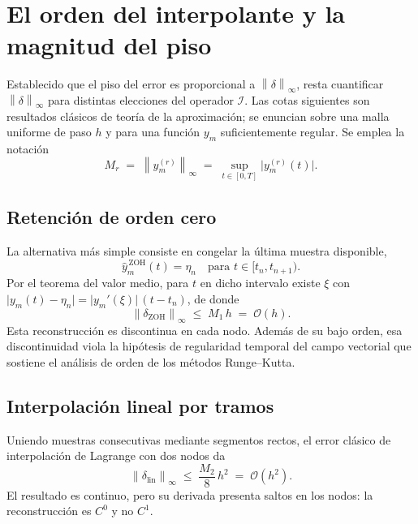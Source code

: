 \documentclass[12pt,a4paper]{article}
\newcommand{\dnorm}[1]{\left\lVert #1 \right\rVert}
\newcommand{\infnorm}[1]{\dnorm{#1}_{\infty}}
\begin{document}
\section{El orden del interpolante y la magnitud del piso}
\label{sec:ordenes}

Establecido que el piso del error es proporcional a $\infnorm{\delta}$, resta
cuantificar $\infnorm{\delta}$ para distintas elecciones del operador
$\mathcal{I}$. Las cotas siguientes son resultados clásicos de teoría de la
aproximación; se enuncian sobre una malla uniforme de paso $h$ y para una función
$y_m$ suficientemente regular. Se emplea la notación
\[
  M_r \;=\; \infnorm{y_m^{(r)}} \;=\; \sup_{t\in[0,T]}\bigl\lvert y_m^{(r)}(t)\bigr\rvert .
\]

\subsection{Retención de orden cero}

La alternativa más simple consiste en congelar la última muestra disponible,
\[
  \hat{y}_m^{\,\mathrm{ZOH}}(t) = \eta_n \quad\text{para } t\in[t_n,t_{n+1}).
\]
Por el teorema del valor medio, para $t$ en dicho intervalo existe $\xi$ con
$\lvert y_m(t)-\eta_n\rvert = \lvert y_m'(\xi)\rvert\,(t-t_n)$, de donde
\begin{equation}
\label{eq:cota-zoh}
  \infnorm{\delta_{\mathrm{ZOH}}} \;\le\; M_1\,h \;=\; \mathcal{O}(h).
\end{equation}
Esta reconstrucción es discontinua en cada nodo. Además de su bajo orden, esa
discontinuidad viola la hipótesis de regularidad temporal del campo vectorial que
sostiene el análisis de orden de los métodos Runge--Kutta.

\subsection{Interpolación lineal por tramos}

Uniendo muestras consecutivas mediante segmentos rectos, el error clásico de
interpolación de Lagrange con dos nodos da
\begin{equation}
\label{eq:cota-lineal}
  \infnorm{\delta_{\mathrm{lin}}} \;\le\; \frac{M_2}{8}\,h^{2} \;=\; \mathcal{O}(h^{2}).
\end{equation}
El resultado es continuo, pero su derivada presenta saltos en los nodos: la
reconstrucción es $C^0$ y no $C^1$.
\end{document}
